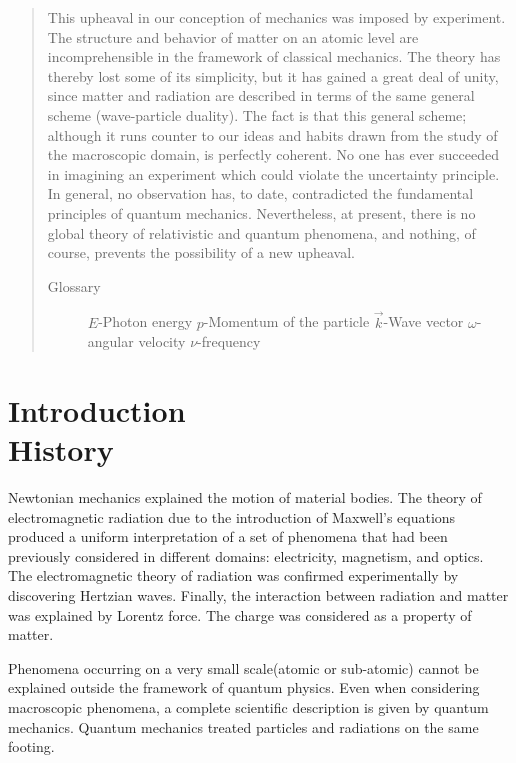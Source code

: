 \documentclass[%
 reprint,
 amsmath,amssymb,
 aps,
]{revtex4-2}
\begin{document}
\begin{abstract}
This upheaval in our conception of mechanics was imposed by experiment. The structure and behavior of matter on an atomic level are incomprehensible in the framework of classical mechanics. The theory has thereby lost some of its simplicity, but it has gained a great deal of unity, since matter and radiation are described in terms of the same general scheme (wave-particle duality). The fact is that this general scheme; although it runs counter to our ideas and habits drawn from the study of the macroscopic domain, is perfectly coherent. No one has ever succeeded in imagining an experiment which could violate the uncertainty principle. In general, no observation has, to date, contradicted the fundamental principles of quantum mechanics. Nevertheless, at present, there is no global theory of relativistic and quantum phenomena, and nothing, of course, prevents the possibility of a new upheaval.

\begin{description}
\item[Glossary]
$E$-Photon energy
$p$-Momentum of the particle
$\overrightarrow{k}$-Wave vector
$\omega$-angular velocity
$\nu$-frequency
\end{description}
\end{abstract}

\maketitle


\section{\label{sec:level1}Introduction\protect\\History}
  Newtonian mechanics explained the motion of material bodies. The theory of electromagnetic radiation due to the introduction of Maxwell's equations produced a uniform interpretation of a set of phenomena that had been previously considered in different domains: electricity, magnetism, and optics. The electromagnetic theory of radiation was confirmed experimentally by discovering Hertzian waves. Finally, the interaction between radiation and matter was explained by Lorentz force. The charge was considered as a property of matter. 

Phenomena occurring on a very small scale(atomic or sub-atomic) cannot be explained outside the framework of quantum physics. Even when considering macroscopic phenomena, a complete scientific description is given by quantum mechanics. Quantum mechanics treated particles and radiations on the same footing.
\end{document}
